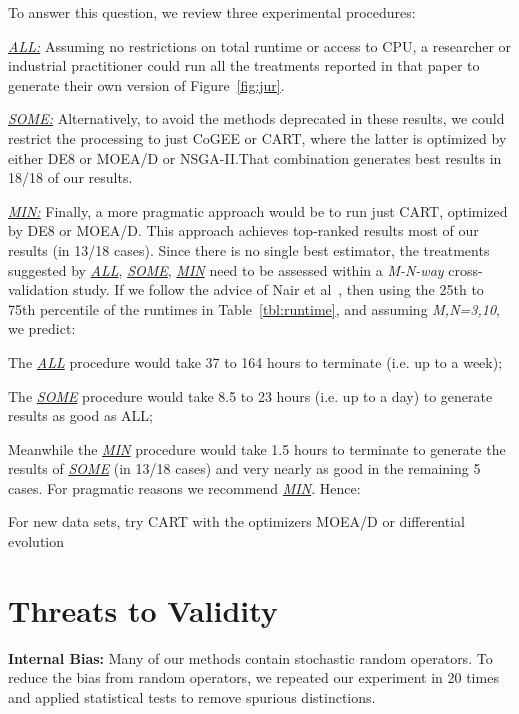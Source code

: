 To answer this question, we review
 three experimental procedures:
\be
\item
\underline{{\em ALL:}} Assuming no restrictions on total runtime or access to   CPU, a researcher
or industrial practitioner could run all the treatments reported in that paper
to generate their own version of Figure~\ref{fig:jur}. 
\item
\underline{{\em SOME:}} Alternatively, to avoid the methods deprecated in these results,
we could restrict the
processing  to just  CoGEE or  CART, where the latter is optimized by either DE8 or MOEA/D or NSGA-II.That combination generates best results in 18/18 of our results.
\item \underline{{\em MIN:}} 
Finally, a more pragmatic approach would be to run just CART, optimized by DE8 or MOEA/D. This approach achieves top-ranked results most of our results
(in 13/18 cases). 
\ee
Since there is no single best estimator, the  treatments suggested by 
\underline{{\em ALL}}, \underline{{\em SOME}}, \underline{{\em MIN}}
need to be assessed within a {\em M-N-way} cross-validation study.
If we follow the advice of Nair et al~\cite{nair18}, then
using the 25th to 75th percentile of the runtimes in   Table~\ref{tbl:runtime}, 
and assuming {\em M,N=3,10}, we predict:
\bi
\item
The \underline{{\em ALL}} procedure would take 37 to   164 hours to terminate (i.e. up to a week);
\item
The \underline{{\em SOME}} procedure would take 8.5 to 23 hours  (i.e. up to a day)
to  generate results
as good as ALL;
\item
Meanwhile the \underline{{\em MIN}}  procedure would take 1.5 hours to terminate to  generate the results
of  \underline{{\em SOME}}  (in 13/18 cases) and very nearly as good in the remaining 5 cases.
\ei
For pragmatic reasons we recommend \underline{{\em MIN}}.
Hence:
\begin{result}{4}
   For new data sets, try
CART
with the optimizers
MOEA/D
or
differential evolution
 \end{result}


\section{Threats to Validity}\label{sect:threats}
 \textbf{Internal Bias:} Many of  our methods contain stochastic random operators. To reduce the bias from random operators, we 
repeated our experiment in 20 times and applied statistical tests to remove spurious distinctions.

